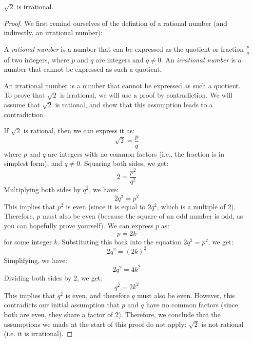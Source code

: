 \begin{proposition}
    $\sqrt{2}$ is irrational.
\end{proposition}
\begin{proof}
    We first remind ourselves of the defintion of a rational number (and indirectly, an irrational number):
    \begin{definition}\label{def:rational-number}
        A \textit{rational number} is a number that can be expressed as the quotient or fraction $\frac{p}{q}$ of two integers,
        where $p$ and $q$ are integers and $q \neq 0$. An \textit{irrational number} is a number that cannot be expressed as such a quotient.
    \end{definition}
    An \hyperref[def:rational-number]{irrational number} is a number that cannot be expressed as such a quotient. To prove that $\sqrt{2}$ is irrational,
    we will use a proof by contradiction. We will assume that $\sqrt{2}$ is rational, and show that this assumption leads to a contradiction.

    If $\sqrt{2}$ is rational, then we can express it as:
    \begin{equation*}
        \sqrt{2} = \frac{p}{q}
    \end{equation*}
    where $p$ and $q$ are integers with no common factors (i.e., the fraction is in simplest form), and $q \neq 0$.
    Squaring both sides, we get:
    \begin{equation*}
        2 = \frac{p^2}{q^2}
    \end{equation*}
    Multiplying both sides by $q^2$, we have:
    \begin{equation*}
        2q^2 = p^2
    \end{equation*}
    This implies that $p^2$ is even (since it is equal to $2q^2$, which is a multiple of 2). Therefore, $p$ must also be even
    (because the square of an odd number is odd, as you can hopefully prove yourself). We can express $p$ as:
    \begin{equation*}
        p = 2k
    \end{equation*}
    for some integer $k$. Substituting this back into the equation $2q^2 = p^2$, we get:
    \begin{equation*}
        2q^2 = (2k)^2
    \end{equation*}
    Simplifying, we have:
    \begin{equation*}
        2q^2 = 4k^2
    \end{equation*}
    Dividing both sides by 2, we get:
    \begin{equation*}
        q^2 = 2k^2
    \end{equation*}
    This implies that $q^2$ is even, and therefore $q$ must also be even. However, this contradicts our initial assumption that $p$ and $q$ have
    no common factors (since both are even, they share a factor of 2). Therefore, we conclude that the assumptions we made at the start 
    of this proof do not apply: $\sqrt{2}$ is not rational (i.e. it is irrational).
\end{proof}